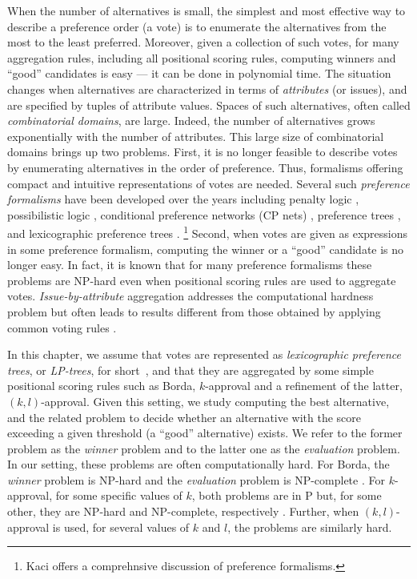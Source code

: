 When the number of alternatives is small, the simplest and most effective 
way to describe a preference order (a vote) is to enumerate the
alternatives from the most to the least preferred. Moreover, given a 
collection of such votes, for many aggregation rules, including all 
positional scoring rules, computing winners and ``good'' candidates is 
easy --- it can be done in polynomial time. The situation changes when
alternatives are characterized in terms of \emph{attributes} (or issues),
and are specified by tuples of attribute values. Spaces of such alternatives,
often called \emph{combinatorial domains}, are large. Indeed, the number 
of alternatives grows exponentially with the number of attributes. This
large size of combinatorial domains brings up two problems. First, it is
no longer feasible to describe votes by enumerating alternatives in the
order of preference. Thus, formalisms offering compact and intuitive
representations of votes are needed. Several such \emph{preference
formalisms} have been developed over the years including penalty logic 
\cite{de1994penalty}, possibilistic logic \cite{DuboisLP91}, conditional
preference networks (CP nets) \cite{bbdh03}, preference
trees \cite{fraser1994ordinal,liu2015reasoning}, 
and lexicographic preference trees \cite{booth:learningLP}.%
\footnote{Kaci \cite{Kaci:Pref} offers a comprehnsive discussion of 
preference formalisms.} Second, when votes are given as expressions in 
some preference formalism, computing the winner or a ``good'' candidate 
is no longer easy. In fact, it is known that for many preference formalisms 
these problems are NP-hard even when positional scoring rules are used 
to aggregate votes. \emph{Issue-by-attribute} aggregation addresses the
computational hardness problem but often leads to results different from 
those obtained by applying common voting rules \cite{fargier:ibi}.
  
In this chapter, we assume that votes are represented as \emph{lexicographic
preference trees}, or \emph{LP-trees}, for short~\cite{booth:learningLP},
and that they are aggregated by some simple positional scoring rules such 
as Borda, $k$-approval and a refinement of the latter, $(k,l)$-approval.
Given this setting, we study computing the best alternative, and the related 
problem to decide whether an alternative with the score exceeding a given 
threshold (a ``good'' alternative) exists. We refer to the former problem 
as the \emph{winner} problem and to the latter one as 
the \emph{evaluation} problem. In our setting, these problems are often
computationally hard. For Borda, the \emph{winner} problem is NP-hard and 
the \emph{evaluation} problem is NP-complete \cite{lang:aggLP}. For $k$-approval, 
for some specific values of $k$, both problems are in P but, for some other, 
they are NP-hard and NP-complete, respectively \cite{lang:aggLP}. Further,
when $(k,l)$-approval is used, for several values 
of $k$ and $l$, the problems are similarly hard.


